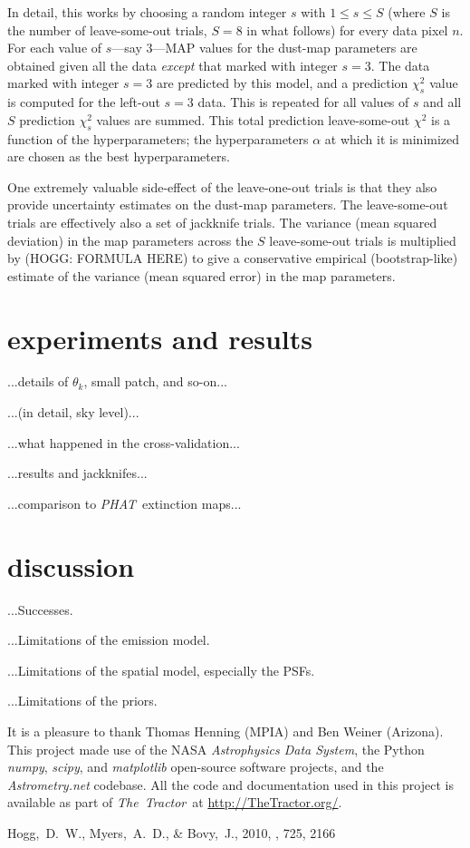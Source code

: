 \documentclass[12pt,pdftex,preprint]{aastex}
\newcommand{\foreign}[1]{\textit{#1}}
\newcommand{\etal}{\foreign{et\,al.}}
\newcommand{\project}[1]{\textsl{#1}}
\newcommand{\TheTractor}{\project{The~Tractor}}
\newcommand{\PHAT}{\project{PHAT}}
\begin{document}
In detail, this works by choosing a random integer $s$ with $1\leq
s\leq S$ (where $S$ is the number of leave-some-out trials, $S=8$ in
what follows) for every data pixel $n$.  For each value of $s$---say
3---MAP values for the dust-map parameters are obtained given all the
data \emph{except} that marked with integer $s=3$.  The data marked
with integer $s=3$ are predicted by this model, and a prediction
$\chi_s^2$ value is computed for the left-out $s=3$ data.  This is
repeated for all values of $s$ and all $S$ prediction $\chi_s^2$
values are summed.  This total prediction leave-some-out $\chi^2$ is a
function of the hyperparameters; the hyperparameters $\alpha$ at which
it is minimized are chosen as the best hyperparameters.

One extremely valuable side-effect of the leave-one-out trials is that
they also provide uncertainty estimates on the dust-map parameters.
The leave-some-out trials are effectively also a set of jackknife
trials.  The variance (mean squared deviation) in the map parameters
across the $S$ leave-some-out trials is multiplied by (HOGG: FORMULA
HERE) to give a conservative empirical (bootstrap-like) estimate of
the variance (mean squared error) in the map parameters.

\section{experiments and results}

...details of $\theta_k$, small patch, and so-on...

...(in detail, sky level)...

...what happened in the cross-validation...

...results and jackknifes...

...comparison to \PHAT\ extinction maps...

\section{discussion}

...Successes.

...Limitations of the emission model.

...Limitations of the spatial model, especially the PSFs.

...Limitations of the priors.

\acknowledgements It is a pleasure to thank Thomas Henning (MPIA) and
Ben Weiner (Arizona).  This project made use of the NASA
\project{Astrophysics Data System}, the Python \project{numpy},
\project{scipy}, and \project{matplotlib} open-source software
projects, and the \project{Astrometry.net} codebase.  All the code and
documentation used in this project is available as part of
\TheTractor\ at \url{http://TheTractor.org/}.

\begin{thebibliography}{70}
\bibitem[Hogg \etal(2010)]{eccentricity}
Hogg,~D.~W., Myers,~A.~D., \& Bovy,~J., 2010, \apj, 725, 2166
\end{thebibliography}
\end{document}
